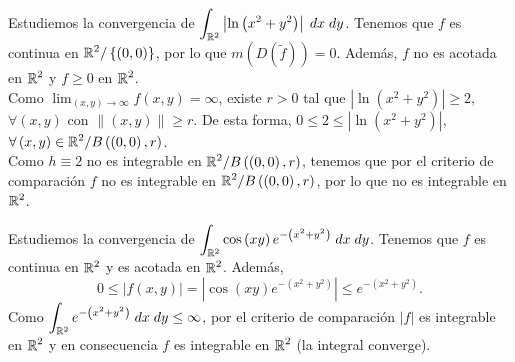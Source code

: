 \begin{eg}
	Estudiemos la convergencia de $\displaystyle \int _{\mathbb{R}^{2}} \left|\ln \left(x^{2}+y^{2}\right)\right| \; dx \; dy $. Tenemos que $\displaystyle f $ es continua en $\displaystyle \mathbb{R}^{2} / \left\{ \left(0,0\right)\right\}  $, por lo que $\displaystyle m\left(D\left(\tilde{f}\right)\right)=0 $. Además, $\displaystyle f $ no es acotada en $\displaystyle \mathbb{R}^{2} $ y $\displaystyle f \geq 0 $ en $\displaystyle \mathbb{R}^{2} $. \\
Como $\displaystyle \lim_{\left(x,y\right) \to \infty}f\left(x,y\right)=\infty $, existe $\displaystyle r > 0 $ tal que $\displaystyle \left|\ln\left(x^{2}+y^{2}\right)\right|\geq 2 $, $\displaystyle \forall \left(x,y\right) $ con $\displaystyle \|\left(x,y\right)\| \geq r $. De esta forma, $\displaystyle 0 \leq 2 \leq \left|\ln\left(x^{2}+y^{2}\right)\right| $, $\displaystyle \forall \left(x,y\right)\in \mathbb{R}^{2} / B\left(\left(0,0\right), r\right) $. \\
Como $\displaystyle h \equiv 2 $ no es integrable en $\displaystyle \mathbb{R}^{2} / B\left(\left(0,0\right), r\right) $, tenemos que por el criterio de comparación $\displaystyle f $ no es integrable en $\displaystyle \mathbb{R}^{2}/B\left(\left(0,0\right),r\right) $, por lo que no es integrable en $\displaystyle \mathbb{R}^{2} $. 
\end{eg}
\begin{eg}
Estudiemos la convergencia de $\displaystyle \int _{\mathbb{R}^{2}}\cos\left(xy\right)e^{-\left(x^{2}+y^{2}\right)} \; dx \; dy $. Tenemos que $\displaystyle f $ es continua en $\displaystyle \mathbb{R}^{2} $ y es acotada en $\displaystyle \mathbb{R}^{2} $. Además,
\[0\leq \left|f\left(x,y\right)\right|= \left|\cos\left(xy\right)e^{-\left(x^{2}+y^{2}\right)}\right|\leq e^{-\left(x^{2}+y^{2}\right)} .\]
Como $\displaystyle \int _{\mathbb{R}^{2}}e^{-\left(x^{2}+y^{2}\right)} \; dx \; dy\leq \infty $, por el criterio de comparación $\displaystyle \left|f\right| $ es integrable en $\displaystyle \mathbb{R}^{2} $ y en consecuencia $\displaystyle f $ es integrable en $\displaystyle \mathbb{R}^{2} $ (la integral converge).
\end{eg}
